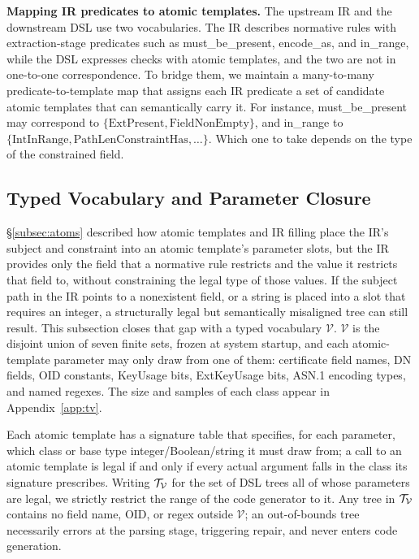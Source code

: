 \textbf{Mapping IR predicates to atomic templates.} The upstream
IR and the downstream DSL use two vocabularies. The IR describes normative rules
with extraction-stage predicates such as must\_be\_present,
encode\_as, and in\_range, while the DSL expresses checks with
atomic templates, and the two are not in one-to-one correspondence. To
bridge them, we maintain a many-to-many predicate-to-template map that assigns each IR
predicate a set of candidate atomic templates that can semantically carry it.
For instance, must\_be\_present may correspond to $\{\mathrm{ExtPresent},
\mathrm{FieldNonEmpty}\}$, and in\_range to $\{\mathrm{IntInRange},
\mathrm{PathLenConstraintHas}, \dots\}$. Which one to take depends on the type
of the constrained field.

\subsection{Typed Vocabulary and Parameter Closure}
\label{subsec:tv}

\S\ref{subsec:atoms} described how atomic templates and IR filling place the
IR's subject and constraint into an atomic template's parameter slots, but the
IR provides only the field that a normative rule restricts and the value it
restricts that field to,
without constraining the legal type of those values. If the subject path
in the IR points to a nonexistent field, or a string is placed into a slot that
requires an integer, a structurally legal but semantically misaligned tree can
still result. This subsection closes that gap with a typed vocabulary
$\mathcal{V}$. $\mathcal{V}$ is the disjoint union of seven finite sets, frozen
at system startup, and each atomic-template parameter may only draw from one of
them: certificate field names, DN fields, OID constants, KeyUsage bits,
ExtKeyUsage bits, ASN.1 encoding types, and named regexes. The size and samples
of each class appear in Appendix~\ref{app:tv}.

Each atomic template has a signature table that specifies, for each parameter,
which class or base type integer/Boolean/string it must draw from; a call to an
atomic template is legal if and only if every actual argument falls in the class its
signature prescribes. Writing $\mathcal{T}_{\mathcal{V}}$ for the set of DSL trees all of whose
parameters are legal, we strictly restrict the range of the code generator to
it. Any tree in $\mathcal{T}_{\mathcal{V}}$ contains no field name, OID, or regex
outside $\mathcal{V}$; an out-of-bounds tree necessarily errors at the parsing
stage, triggering repair, and never enters code generation.

